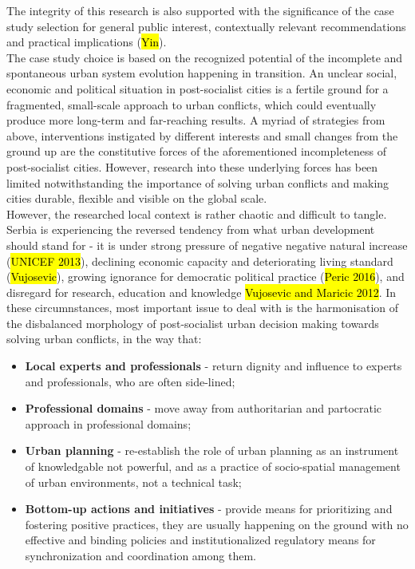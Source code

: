 \documentclass[11pt]{report}
\begin{document}
The integrity of this research is also supported with the significance of the case study selection for general public interest, contextually relevant recommendations and practical implications (\hl{Yin}).
\\
The case study choice is based on the recognized potential of the incomplete and spontaneous urban system evolution happening in transition.
An unclear social, economic and political situation in post-socialist cities is a fertile ground for a fragmented, small-scale approach to urban conflicts, which could eventually produce more long-term and far-reaching results.
A myriad of strategies from above, interventions instigated by different interests and small changes from the ground up are the constitutive forces of the aforementioned incompleteness of post-socialist cities.
However, research into these underlying forces has been limited notwithstanding the importance of solving urban conflicts and making cities durable, flexible and visible on the global scale.
\\
However, the researched local context is rather chaotic and difficult to tangle.
Serbia is experiencing the reversed tendency from what urban development should stand for - it is under strong pressure of negative negative natural increase (\hl{UNICEF 2013}), declining economic capacity and deteriorating living standard (\hl{Vujosevic}), growing ignorance for democratic political practice (\hl{Peric 2016}), and disregard for research, education and  knowledge \hl{Vujosevic and Maricic 2012}.
In these circumnstances, most important issue to deal with is the harmonisation of the disbalanced morphology of post-socialist urban decision making towards solving urban conflicts, in the way that:
\begin{itemize}
\item \textbf{Local experts and professionals} - return dignity and influence to experts and professionals, who are often side-lined;

\item \textbf{Professional domains} - move away from authoritarian and partocratic approach in professional domains;

\item \textbf{Urban planning} - re-establish the role of urban planning as an instrument of knowledgable not powerful, and as a practice of socio-spatial management of urban environments, not a technical task;

\item \textbf{Bottom-up actions and initiatives}  - provide means for prioritizing and fostering positive practices, they are usually happening on the ground with no effective  and  binding policies  and institutionalized  regulatory  means  for synchronization  and  coordination  among  them.
\end{itemize}
\end{document}
